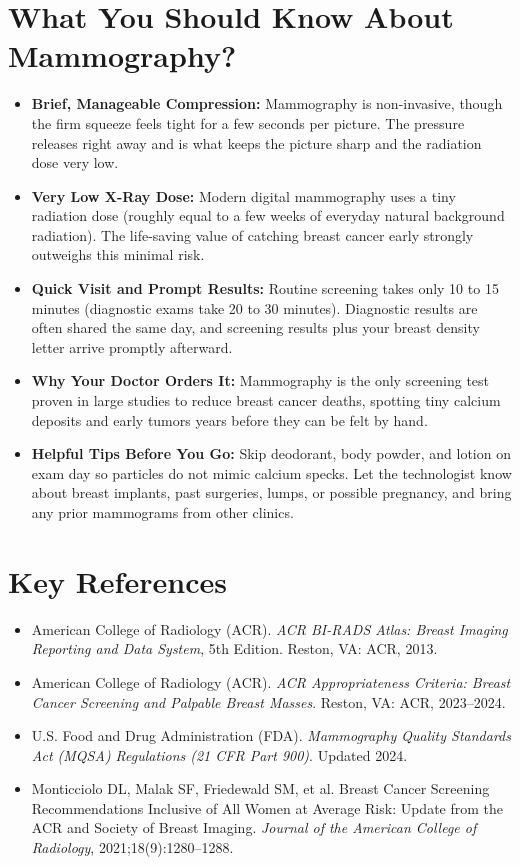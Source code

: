 \section{What You Should Know About Mammography?}

\begin{itemize}
    \item \textbf{Brief, Manageable Compression:} Mammography is non-invasive, though the firm squeeze feels tight for a few seconds per picture. The pressure releases right away and is what keeps the picture sharp and the radiation dose very low.
    \item \textbf{Very Low X-Ray Dose:} Modern digital mammography uses a tiny radiation dose (roughly equal to a few weeks of everyday natural background radiation). The life-saving value of catching breast cancer early strongly outweighs this minimal risk.
    \item \textbf{Quick Visit and Prompt Results:} Routine screening takes only 10 to 15 minutes (diagnostic exams take 20 to 30 minutes). Diagnostic results are often shared the same day, and screening results plus your breast density letter arrive promptly afterward.
    \item \textbf{Why Your Doctor Orders It:} Mammography is the only screening test proven in large studies to reduce breast cancer deaths, spotting tiny calcium deposits and early tumors years before they can be felt by hand.
    \item \textbf{Helpful Tips Before You Go:} Skip deodorant, body powder, and lotion on exam day so particles do not mimic calcium specks. Let the technologist know about breast implants, past surgeries, lumps, or possible pregnancy, and bring any prior mammograms from other clinics.
\end{itemize}

\section{Key References}

\begin{itemize}
    \item American College of Radiology (ACR). \textit{ACR BI-RADS Atlas: Breast Imaging Reporting and Data System}, 5th Edition. Reston, VA: ACR, 2013.
    \item American College of Radiology (ACR). \textit{ACR Appropriateness Criteria: Breast Cancer Screening and Palpable Breast Masses}. Reston, VA: ACR, 2023--2024.
    \item U.S. Food and Drug Administration (FDA). \textit{Mammography Quality Standards Act (MQSA) Regulations (21 CFR Part 900)}. Updated 2024.
    \item Monticciolo DL, Malak SF, Friedewald SM, et al. Breast Cancer Screening Recommendations Inclusive of All Women at Average Risk: Update from the ACR and Society of Breast Imaging. \textit{Journal of the American College of Radiology}, 2021;18(9):1280--1288.
\end{itemize}
